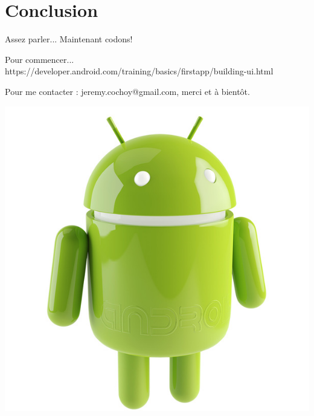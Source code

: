 \documentclass{beamer}
\begin{document}
\section{Conclusion}
\begin{frame}
\begin{alertblock}{Assez parler...}
Maintenant codons!
\end{alertblock}
\begin{block}{Pour commencer...}
https://developer.android.com/training/basics/firstapp/building-ui.html
\end{block}

\end{frame}
\begin{frame}
\begin{center}
Pour me contacter : jeremy.cochoy@gmail.com, merci et à bientôt.

\medskip
\medskip
\medskip
\medskip

\includegraphics[scale=0.18]{android.jpg}
\end{center}
\end{frame}
\end{document}
